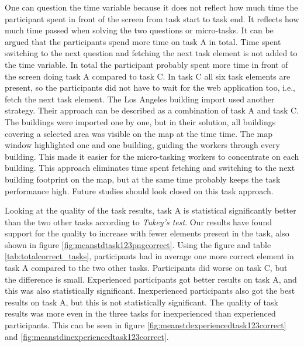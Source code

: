 One can question the time variable because it does not reflect how much time the participant spent in front of the screen from task start to task end. It reflects how much time passed when solving the two questions or micro-tasks. It can be argued that the participants spend more time on task A in total. Time spent switching to the next question and fetching the next task element is not added to the time variable. In total the participant probably spent more time in front of the screen doing task A compared to task C. In task C all six task elements are present, so the participants did not have to wait for the web application too, i.e., fetch the next task element. The Los Angeles building import used another strategy. Their approach can be described as a combination of task A and task C. The buildings were imported one by one, but in their solution, all buildings covering a selected area was visible on the map at the time time. The map window highlighted one and one building, guiding the workers through every building. This made it easier for the micro-tasking workers to concentrate on each building. This approach eliminates time spent fetching and switching to the next building footprint on the map, but at the same time probably keeps the task performance high. Future studies should look closed on this task approach.

Looking at the quality of the task results, task A is statistical significantly better than the two other tasks according to \textit{Tukey's test}. Our results have found support for the quality to increase with fewer elements present in the task, also shown in figure \ref{fig:meanstdtask123pngcorrect}. Using the figure and table \ref{tab:totalcorrect_tasks}, participants had in average one more correct element in task A compared to the two other tasks. Participants did worse on task C, but the difference is small. Experienced participants got better results on task A, and this was also statistically significant. Inexperienced participants also got the best results on task A, but this is not statistically significant. The quality of task results was more even in the three tasks for inexperienced than experienced participants. This can be seen in figure \ref{fig:meanstdexperiencedtask123correct} and \ref{fig:meanstdinexperiencedtask123correct}. 


